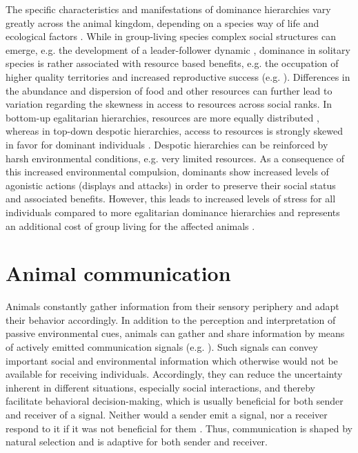 \documentclass[11pt,pdftex]{article}
\begin{document}
The specific characteristics and manifestations of dominance hierarchies vary greatly across the animal kingdom, depending on a species way of life and ecological factors \citep{Janson1985, Cigliano1993, Sapolsky2005}. While in group-living species complex social structures can emerge, e.g. the development of a leader-follower dynamic \citep{Strandburg2018}, dominance in solitary species is rather associated with resource based benefits, e.g. the occupation of higher quality territories and increased reproductive success (e.g. \citealp{Cigliano1993}). Differences in the abundance and dispersion of food and other resources can further lead to variation regarding the skewness in access to resources across social ranks. In bottom-up egalitarian hierarchies, resources are more equally distributed \citep{Sapolsky2005}, whereas in top-down despotic hierarchies, access to resources is strongly skewed in favor for dominant individuals \citep{Kappeler2008}. Despotic hierarchies can be reinforced by harsh environmental conditions, e.g. very limited resources. As a consequence of this increased environmental compulsion, dominants show increased levels of agonistic actions (displays and attacks) in order to preserve their social status and associated benefits. However, this leads to increased levels of stress for all individuals compared to more egalitarian dominance hierarchies and represents an additional cost of group living for the affected animals \citep{Janson1985, Creel1996, Cavigelli1999, Sapolsky2005, Kappeler2008}.


\section{Animal communication}
Animals constantly gather information from their sensory periphery and adapt their behavior accordingly. In addition to the perception and interpretation of passive environmental cues, animals can gather and share information by means of actively emitted communication signals (e.g. \citealp{Demartsev2018, Cornhill2020, Ritschard2010}). Such signals can convey important social and environmental information which otherwise would not be available for receiving individuals. Accordingly, they can reduce the uncertainty inherent in different situations, especially social interactions, and thereby facilitate behavioral decision-making, which is usually beneficial for both sender and receiver of a signal. Neither would a sender emit a signal, nor a receiver respond to it if it was not beneficial for them \citep{Seyfarth2017}. Thus, communication is shaped by natural selection and is adaptive for both sender and receiver.
\end{document}
